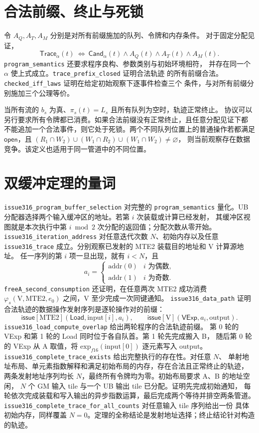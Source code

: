 \documentclass[UTF8,a4paper,11pt,fontset=fandol]{ctexart}
\newcommand{\kw}[1]{\mathsf{#1}}
\begin{document}
\section{合法前缀、终止与死锁}
令 \(A_Q,A_T,A_M\) 分别是对所有前缀施加的队列、令牌和内存条件。
对于固定分配见证，
\[
 \mathsf{Trace}_{\alpha}(t)\ \iff\
 \mathsf{Cand}_{\alpha}(t)\land A_Q(t)\land A_T(t)\land A_M(t).
\]
\texttt{program\_semantics} 还要求程序良构、参数类别与初始环境相符，
并存在同一个 \(\alpha\) 使上式成立。\texttt{trace\_prefix\_closed} 证明合法轨迹
的所有前缀合法。\texttt{checked\_iff\_laws} 证明在给定初始观察下逐事件检查三个
条件，与对所有前缀分别施加三个公理等价。

当所有流的 \(b_s\) 为真、\(\pi_s(t)=L_s\) 且所有队列为空时，轨迹正常终止。
协议可以另行要求所有令牌都已消费。如果合法前缀没有正常终止，且任意分配见证下都
不能追加一个合法事件，则它处于死锁。两个不同队列位置上的普通操作若都满足
\(\kw{open}\)，且
\((R_1\cap W_2)\cup(W_1\cap R_2)\cup(W_1\cap W_2)\ne\varnothing\)，
则当前观察存在数据竞争。该定义也适用于同一管道中的不同位置。

\section{双缓冲定理的量词}
\texttt{issue316\_program\_buffer\_selection} 对完整的 \texttt{program\_semantics}
量化。UB 分配器选择两个输入缓冲区的地址。若第 \(i\) 次装载或计算已经发射，
其缓冲区视图就是本次执行中第 \(i\bmod 2\) 次分配的返回值；分配次数从零开始。
\texttt{issue316\_iteration\_address} 对任意迭代次数 \(N\)、初始内存以及任意
\texttt{issue316\_trace} 成立。分别观察已发射的 MTE2 装载目的地址和 V 计算源地址。
任一序列的第 \(i\) 项一旦出现，就有 \(i<N\)，且
\[
 a_i=\begin{cases}\mathrm{addr}(0)& i\text{ 为偶数},\\
                    \mathrm{addr}(1)& i\text{ 为奇数}.\end{cases}
\]
\texttt{freeA\_second\_consumption} 还证明，在任意两次 MTE2 成功消费
\(\varphi_s(\mathrm V,\mathrm{MTE2},e_0)\) 之间，V 至少完成一次同键通知。
\texttt{issue316\_data\_path} 证明合法轨迹的数据操作发射序列是逐轮操作对的前缀：
\[
  \kw{issue}[\mathrm{MTE2}](\kw{Load},\mathrm{input}[i],a_i),\qquad
  \kw{issue}[\mathrm V](\kw{VExp},a_i,\mathrm{output}).
\]
\texttt{issue316\_load\_compute\_overlap} 给出两轮程序的合法轨迹前缀。
第 0 轮的 VExp 和第 1 轮的 Load 同时位于各自队首。第 1 轮先完成搬入 B，
随后第 0 轮的 VExp 从 A 取值，将 \(\mathrm{exp}_{f16}(\mathrm{input}[0])\)
逐元素写入 \(\mathrm{output}\)。
\texttt{issue316\_complete\_trace\_exists} 给出完整执行的存在性。对任意 \(N\)、
单射地址布局、单元素指数解释和满足初始布局的内存，存在合法且正常终止的轨迹，
两条发射地址序列均长 \(N\)，最终所有令牌均为零。初始布局要求 A、B 的地址空闲，
\(N\) 个 GM 输入 tile 与一个 UB 输出 tile 已分配。证明先完成初始通知，
每轮依次完成装载和写入输出的异步指数运算，最后完成两个等待并排空两条管道。
\texttt{issue316\_complete\_trace\_for\_all\_counts} 对任意输入 tile 序列给出一份
具体初始内存，同样覆盖 \(N=0\)。定理的全称结论是发射地址选择；终止结论针对构造的轨迹。
\end{document}
